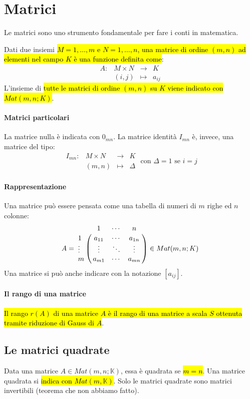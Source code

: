 \section{Matrici}
Le matrici sono uno strumento fondamentale per fare i conti in matematica.

Dati due insiemi \hl{$M = {1, \ldots, m}$ e $N = {1, \ldots, n}$, una matrice di
ordine $(m, n)$ ad elementi nel campo $K$ è una funzione definita come}:
\[
    \begin{array}{cccc}
        A: &M \times N &\to &K \\
        &(i,j) &\mapsto &a_{ij}
    \end{array}
\]
L'insieme di \hl{tutte le matrici di ordine $(m,n)$ su $K$ viene indicato con
$Mat(m,n;K)$}.

\paragraph{Matrici particolari} La matrice nulla è indicata con $0_{mn}$. La
matrice identità $I_{mn}$ è, invece, una matrice del tipo:
\[
    \begin{array}{cccc}
        I_{mn}: & M \times N & \to & K \\
        & (m,n) & \mapsto & \Delta
    \end{array} \text{ con } \Delta{} = 1 \text{ se } i = j
\]

\paragraph{Rappresentazione} Una matrice può essere pensata come una tabella di
numeri di $m$ righe ed $n$ colonne:
\[
    A =
    \bordermatrix{~ & 1 & \cdots & n \cr
                  1 & a_{11} & \cdots & a_{1n} \cr
                  \vdots & \vdots & \ddots & \vdots \cr
                  m & a_{m1} & \cdots & a_{mn} \cr }
    \in Mat(m,n;K)
\]
Una matrice si può anche indicare con la notazione $[a_{ij}]$.

\paragraph{Il rango di una matrice} \hl{Il rango $r(A)$ di una matrice $A$ è il
rango di una matrice a scala $S$ ottenuta tramite riduzione di Gauss di $A$}.

\subsection{Le matrici quadrate}
Data una matrice $A \in Mat(m,n;\mathbb{K})$, essa è quadrata se \hl{$m = n$}.
Una matrice quadrata si \hl{indica con $Mat(m,\mathbb{K})$}. Solo le matrici
quadrate sono matrici invertibili (teorema che non abbiamo fatto).

